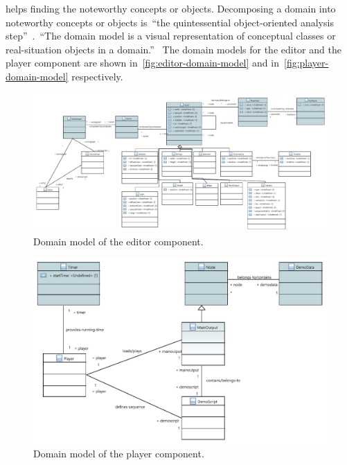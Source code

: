 \documentclass[%
    a4paper,    %
    justified,  %
    nobib,      %
    openany     %
]{tufte-book}
\begin{document}
 helps finding the noteworthy concepts or
objects. Decomposing a domain into noteworthy concepts or objects
is~\enquote{the quintessential object-oriented analysis
step}~\cite{larman_applying_2004}.~\enquote{The domain model is a visual
representation of conceptual classes or real-situation objects in a
domain.}~\cite{larman_applying_2004} The domain models for the editor and the
player component are shown in~\autoref{fig:editor-domain-model} and
in~\autoref{fig:player-domain-model} respectively.

\begin{figure}[h]
  \caption{Domain model of the editor component.}
  \label{fig:editor-domain-model}
  \includegraphics[width=0.95\linewidth]{images/editor-domain-model}
\end{figure}

\begin{figure}[h]
  \caption{Domain model of the player component.}
  \label{fig:player-domain-model}
  \includegraphics[width=0.95\linewidth]{images/player-domain-model}
\end{figure}

\end{document}
